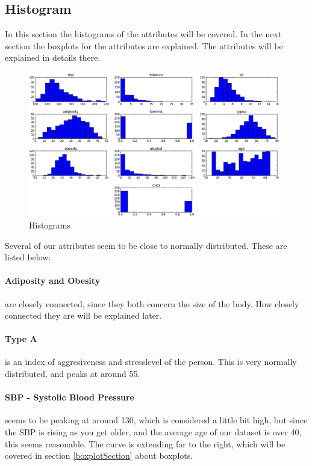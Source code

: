 \subsection{Histogram}
In this section the histograms of the attributes will be covered. In the next section the boxplots for the attributes are explained. The attributes will be explained in details there.
\begin{figure}[H]
\centering
\includegraphics[width=11cm, keepaspectratio=true]{pictures/histogram.png}
\vspace{-0.2cm}
\caption{\footnotesize Histograms}
\vspace{-0.5cm}
\label{histogram}
\end{figure}
Several of our attributes seem to be close to normally distributed. These are listed below:
\paragraph{Adiposity and Obesity} are closely connected, since they both concern the size of the body. How closely connected they are will be explained later.

\paragraph{Type A} is an index of aggresiveness and stresslevel of the person. This is very normally distributed, and peaks at around 55.

\paragraph{SBP - Systolic Blood Pressure} 	seems to be peaking at around 130, which is considered a little bit high, but since the SBP is rising as you get older, and the average age of our dataset is over 40, this seems reasonable. The curve is extending far to the right, which will be covered in section \ref{boxplotSection} about boxplots.

